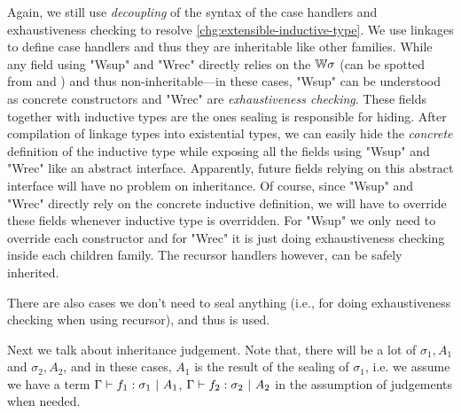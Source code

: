Again, we still use \textit{decoupling} of the syntax of the case
handlers and exhaustiveness checking to resolve
\ref{chg:extensible-inductive-type}. We use linkages to define
case handlers and thus they are inheritable like other families.
While any field using "Wsup" and "Wrec" directly relies on the
${\mathbb{W}}\sigma$ (can be spotted from  and
) and thus non-inheritable---in these cases, "Wsup"
can be understood as concrete constructors and "Wrec" are
\textit{exhaustiveness checking}. These fields together with inductive
types are the ones sealing is responsible for hiding. After compilation
of linkage types into existential types, we can easily hide the
\textit{concrete} definition of the inductive type while exposing all
the fields using "Wsup" and "Wrec" like an abstract interface.
Apparently, future fields relying on this abstract interface will have no
problem on inheritance.
Of course, since "Wsup" and "Wrec" directly rely on the concrete inductive definition, we will have to override these fields whenever inductive type is overridden. For "Wsup" we only need to override each constructor and for "Wrec" it is just doing exhaustiveness checking inside each children family. The recursor handlers however, can be safely inherited.

There are also cases we don't need to seal anything (i.e., for doing
exhaustiveness checking when using recursor), and thus  is
used. 





Next we talk about inheritance judgement. Note that, there will be a lot of $\sigma_1, A_1$ and $\sigma_2, A_2$, and in these cases, $A_1$ is the result of the sealing of $\sigma_1$, i.e. we assume we have a term ${ {\Gamma} \vdash {f_1} : {\sigma_1} \ |\ {A_1} }$, ${ {\Gamma} \vdash {f_2} : {\sigma_2} \ |\ {A_2} }$ in the assumption of judgements when needed.


